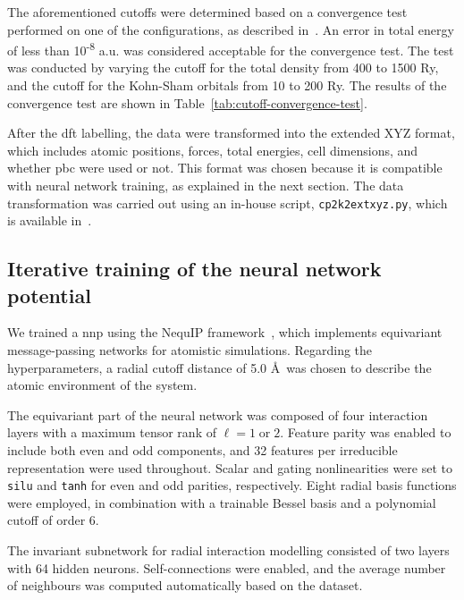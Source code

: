 The aforementioned cutoffs were determined based on a convergence test performed on one of the configurations, as described in~\citep{cp2k_developersHowConvergeCUTOFF}. An error in total energy of less than 10\textsuperscript{-8} a.u. was considered acceptable for the convergence test. The test was conducted by varying the cutoff for the total density from 400 to 1500 Ry, and the cutoff for the Kohn-Sham orbitals from 10 to 200 Ry. The results of the convergence test are shown in Table~\ref{tab:cutoff-convergence-test}.

After the \ac{dft} labelling, the data were transformed into the extended XYZ format, which includes atomic positions, forces, total energies, cell dimensions, and whether \ac{pbc} were used or not. This format was chosen because it is compatible with neural network training, as explained in the next section. The data transformation was carried out using an in-house script, \texttt{cp2k2extxyz.py}, which is available in~\citep{makhmudovCp2k_to_extxyzScriptThat}.



\subsection{Iterative training of the neural network potential} \label{subsec:iterative-training-of-the-neural-network-potential}
We trained a \ac{nnp} using the NequIP framework~\citep{batznerE3equivariantGraphNeural2022}, which implements equivariant message-passing networks for atomistic simulations. Regarding the hyperparameters, a radial cutoff distance of 5.0 \AA\ was chosen to describe the atomic environment of the system.

The equivariant part of the neural network was composed of four interaction layers with a maximum tensor rank of $\ell = 1 \; \text{or} \; 2$. Feature parity was enabled to include both even and odd components, and 32 features per irreducible representation were used throughout. Scalar and gating nonlinearities were set to \texttt{silu} and \texttt{tanh} for even and odd parities, respectively. Eight radial basis functions were employed, in combination with a trainable Bessel basis and a polynomial cutoff of order 6.

The invariant subnetwork for radial interaction modelling consisted of two layers with 64 hidden neurons. Self-connections were enabled, and the average number of neighbours was computed automatically based on the dataset.

